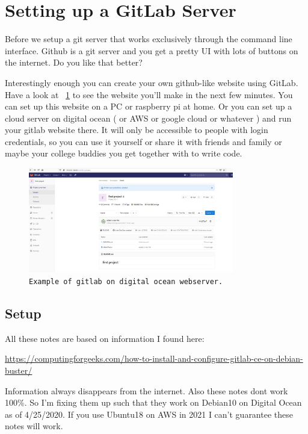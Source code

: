 \documentclass[10pt]{article}
\begin{document}
\section{Setting up a GitLab Server}

Before we setup a git server that works exclusively through the command line
interface. Github is a git server and you get a pretty UI with lots of buttons
on the internet. Do you like that better?

Interestingly enough you can create your own github-like website using GitLab.
Have a look at ~\ref{fig:gitlab} to see the website you'll make in the next few
minutes. You can set up this website on a PC or raspberry pi at home. Or you can
set up a cloud server on digital ocean ( or AWS or google cloud or whatever )
and run your gitlab website there. It will only be accessible to people with
login credentials, so you can use it yourself or share it with friends and
family or maybe your college buddies you get together with to write code.

\begin{figure}[h]
\centering
	\includegraphics[width=0.8\textwidth]{Images/gitlab.PNG}
	\caption{{\small \texttt{Example of gitlab on digital ocean webserver.}}}
	\label{fig:gitlab}
\end{figure}

\subsection{Setup}
All these notes are based on information I found here:

\url{https://computingforgeeks.com/how-to-install-and-configure-gitlab-ce-on-debian-buster/}

Information always disappears from the internet. Also these notes dont work
100\%. So I'm fixing them up such that they work on Debian10 on Digital Ocean as
of 4/25/2020. If you use Ubuntu18 on AWS in 2021 I can't guarantee these notes
will work.
\end{document}
